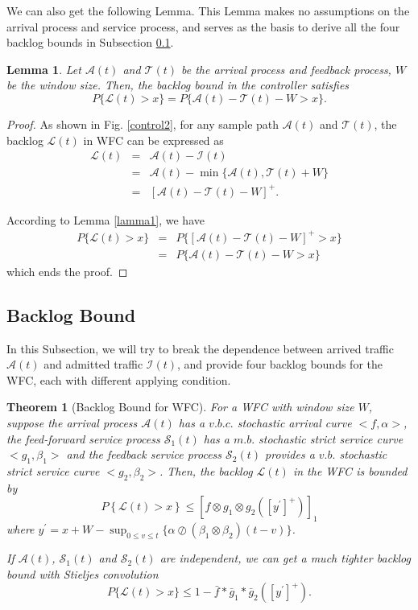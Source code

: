 \documentclass[paper]{ieice}
\newtheorem{theorem}{Theorem}
\newtheorem{lemma}{Lemma}
\newtheorem{proof}{Proof}
\begin{document}
We can also get the following Lemma. This Lemma makes no assumptions on the arrival process and service process, and serves as the basis to derive all the four backlog bounds in Subsection \ref{backlog}.
\begin{lemma}\label{lama2}
Let $\mathcal{A}(t)$ and $\mathcal{T}(t)$ be the arrival process and feedback process, $W$ be the window size. Then, the backlog bound in the controller satisfies
$$P\{\mathcal{L}(t)> x\}=P\{\mathcal{A}(t)-\mathcal{T}(t)-W> x\}.$$
\end{lemma}
\begin{proof}
As shown in Fig. \ref{control2}, for any sample path $\mathcal{A}(t)$ and $\mathcal{T}(t)$, the backlog $\mathcal{L}(t)$ in WFC can be expressed as
\begin{eqnarray}
  \mathcal{L}(t)&=&\mathcal{A}(t)-\mathcal{I}(t)\nonumber\\
      &=&\mathcal{A}(t)-\min\{\mathcal{A}(t),\mathcal{T}(t)+W\}\nonumber\\
      &=&[\mathcal{A}(t)-\mathcal{T}(t)-W]^+.\nonumber
\end{eqnarray}

According to Lemma \ref{lamma1}, we have
\begin{eqnarray*}
  P\{\mathcal{L}(t)>x\}&=&P\{[\mathcal{A}(t)-\mathcal{T}(t)-W]^+>x\}\\
  &=&P\{\mathcal{A}(t)-\mathcal{T}(t)-W>x\}
\end{eqnarray*}
which ends the proof.\QED
\end{proof}

\subsection{Backlog Bound}\label{backlog}
In this Subsection, we will try to break the dependence between arrived traffic $\mathcal{A}(t)$ and admitted traffic $\mathcal{I}(t)$, and provide four backlog bounds for the WFC, each with different applying condition.
\begin{theorem}[Backlog Bound for WFC]\label{theorem1}
For a WFC with window size $W$, suppose the arrival process $\mathcal{A}(t)$ has a $v.b.c.$ stochastic arrival curve $<f,\alpha>$, the feed-forward service process $\mathcal{S}_1(t)$ has a $m.b.$ stochastic strict service curve $<g_1,\beta_1>$ and the feedback service process $\mathcal{S}_2(t)$ provides a $v.b.$ stochastic strict service curve $<g_2,\beta_2>$. Then, the backlog $\mathcal{L}(t)$ in the WFC is bounded by
\begin{equation}\label{eqn1}
P\left\{\mathcal{L}(t)>x\right\}\leq [f\otimes g_1\otimes g_2([y^\prime]^+)]_1
\end{equation}
where $y^\prime=x+W-\sup_{0\leq v\leq t}\{\alpha\oslash(\beta_1\otimes\beta_2)(t-v)\}$.

If $\mathcal{A}(t)$, $\mathcal{S}_1(t)$ and $\mathcal{S}_2(t)$ are independent, we can get a much tighter backlog bound with Stieljes convolution
\begin{equation}\label{eqn2}
P\{\mathcal{L}(t)>x\}\leq 1-\bar{f}\ast\bar{g}_1\ast\bar{g}_2([y^\prime]^+).
\end{equation}
\end{theorem}
\end{document}
